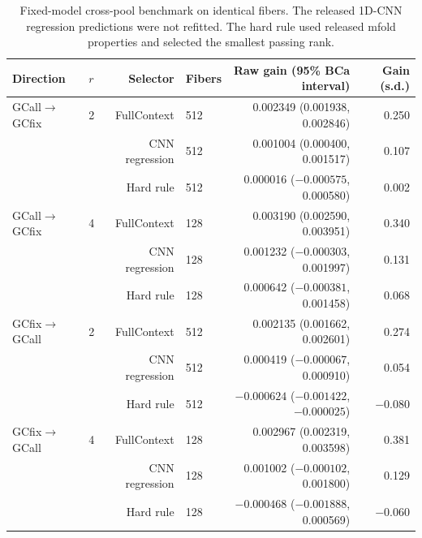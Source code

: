 \documentclass[10pt]{article}
\begin{document}
\begin{table}[H]
\centering
\scriptsize
\begin{tabular}{@{}llrlrr@{}}
\toprule
Direction & $r$ & Selector & Fibers & Raw gain (95\% BCa interval) & Gain (s.d.) \\
\midrule
GCall$\rightarrow$GCfix & 2 & FullContext & 512 & 0.002349 (0.001938, 0.002846) & 0.250 \\
 &  & CNN regression & 512 & 0.001004 (0.000400, 0.001517) & 0.107 \\
 &  & Hard rule & 512 & 0.000016 ($-0.000575$, 0.000580) & 0.002 \\
GCall$\rightarrow$GCfix & 4 & FullContext & 128 & 0.003190 (0.002590, 0.003951) & 0.340 \\
 &  & CNN regression & 128 & 0.001232 ($-0.000303$, 0.001997) & 0.131 \\
 &  & Hard rule & 128 & 0.000642 ($-0.000381$, 0.001458) & 0.068 \\
GCfix$\rightarrow$GCall & 2 & FullContext & 512 & 0.002135 (0.001662, 0.002601) & 0.274 \\
 &  & CNN regression & 512 & 0.000419 ($-0.000067$, 0.000910) & 0.054 \\
 &  & Hard rule & 512 & $-0.000624$ ($-0.001422$, $-0.000025$) & $-0.080$ \\
GCfix$\rightarrow$GCall & 4 & FullContext & 128 & 0.002967 (0.002319, 0.003598) & 0.381 \\
 &  & CNN regression & 128 & 0.001002 ($-0.000102$, 0.001800) & 0.129 \\
 &  & Hard rule & 128 & $-0.000468$ ($-0.001888$, 0.000569) & $-0.060$ \\
\bottomrule
\end{tabular}
\caption{Fixed-model cross-pool benchmark on identical fibers. The released 1D-CNN regression predictions were not refitted. The hard rule used released mfold properties and selected the smallest passing rank.}
\label{tab:s-public-sota}
\end{table}
\end{document}

